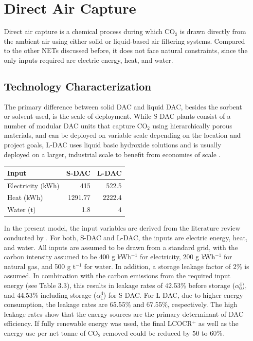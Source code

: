 \section{Direct Air Capture}
Direct air capture is a chemical process during which CO$_2$ is drawn directly from the ambient air using either solid or liquid-based air filtering systems. Compared to the other NETs discussed before, it does not face natural constraints, since the only inputs required are electric energy, heat, and water.
\subsection{Technology Characterization}
The primary difference between solid DAC and liquid DAC, besides the sorbent or solvent used, is the scale of deployment. While S-DAC plants consist of a number of modular DAC units that capture CO$_2$ using hierarchically porous materials, and can be deployed on variable scale depending on the location and project goals, L-DAC uses liquid basic hydroxide solutions and is usually deployed on a larger, industrial scale to benefit from economies of scale \parencite{mcqueen_review_2021}.\vspace{2mm}

\begin{table}
\vspace*{-\baselineskip}
\begin{tabular}{lrr}
\hline
\textbf{Input}                                                      & \textbf{S-DAC} & \textbf{L-DAC} \\ \hline
Electricity (kWh) & 415            & 522.5          \\
Heat (kWh)        & 1291.77        & 2222.4         \\
Water (t)         & 1.8            & 4              \\
\hline
\end{tabular}
\label{us-case-table}
\end{table}

In the present model, the input variables are derived from the literature review conducted by \textcite{eke_comprehensive_2025}. For both, S-DAC and L-DAC, the inputs are electric energy, heat, and water. All inputs are assumed to be drawn from a standard grid, with the carbon intensity assumed to be 400 g kWh$^{-1}$ for electricity, 200 g kWh$^{-1}$ for natural gas, and 500 g t$^{-1}$ for water. In addition, a storage leakage factor of 2\% is assumed. In combination with the carbon emissions from the required input energy (see Table 3.3), this results in leakage rates of 42.53\% before storage ($\alpha_0^4$), and 44.53\% including storage ($\alpha_1^4$) for S-DAC. For L-DAC, due to higher energy consumption, the leakage rates are 65.55\% and 67.55\%, respectively. The high leakage rates show that the energy sources are the primary determinant of DAC efficiency. If fully renewable energy was used, the final LCOCR$^+$ as well as the energy use per net tonne of CO$_2$ removed could be reduced by 50 to 60\%.

